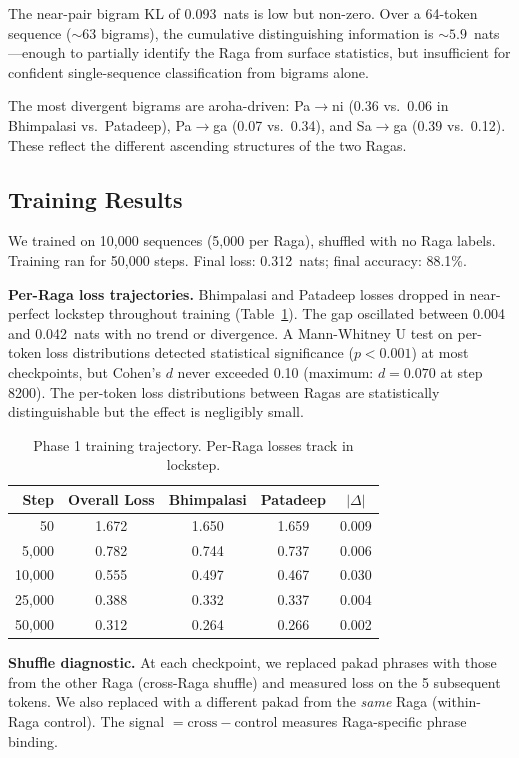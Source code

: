 \documentclass[11pt,a4paper]{article}
\begin{document}
The near-pair bigram KL of 0.093~nats is low but non-zero. Over a 64-token sequence (${\sim}63$ bigrams), the cumulative distinguishing information is ${\sim}5.9$~nats---enough to partially identify the Raga from surface statistics, but insufficient for confident single-sequence classification from bigrams alone.

The most divergent bigrams are aroha-driven: Pa$\to$ni (0.36 vs.\ 0.06 in Bhimpalasi vs.\ Patadeep), Pa$\to$ga (0.07 vs.\ 0.34), and Sa$\to$ga (0.39 vs.\ 0.12). These reflect the different ascending structures of the two Ragas.

\subsection{Training Results}

We trained on 10,000 sequences (5,000 per Raga), shuffled with no Raga labels. Training ran for 50,000 steps. Final loss: 0.312~nats; final accuracy: 88.1\%.

\textbf{Per-Raga loss trajectories.} Bhimpalasi and Patadeep losses dropped in near-perfect lockstep throughout training (Table~\ref{tab:phase1_loss}). The gap oscillated between 0.004 and 0.042~nats with no trend or divergence. A Mann-Whitney U test on per-token loss distributions detected statistical significance ($p < 0.001$) at most checkpoints, but Cohen's $d$ never exceeded 0.10 (maximum: $d = 0.070$ at step 8200). The per-token loss distributions between Ragas are statistically distinguishable but the effect is negligibly small.

\begin{table}[H]
\centering
\caption{Phase 1 training trajectory. Per-Raga losses track in lockstep.}
\label{tab:phase1_loss}
\begin{tabular}{rcccc}
\toprule
Step & Overall Loss & Bhimpalasi & Patadeep & $|\Delta|$ \\
\midrule
50 & 1.672 & 1.650 & 1.659 & 0.009 \\
5,000 & 0.782 & 0.744 & 0.737 & 0.006 \\
10,000 & 0.555 & 0.497 & 0.467 & 0.030 \\
25,000 & 0.388 & 0.332 & 0.337 & 0.004 \\
50,000 & 0.312 & 0.264 & 0.266 & 0.002 \\
\bottomrule
\end{tabular}
\end{table}

\textbf{Shuffle diagnostic.} At each checkpoint, we replaced pakad phrases with those from the other Raga (cross-Raga shuffle) and measured loss on the 5 subsequent tokens. We also replaced with a different pakad from the \emph{same} Raga (within-Raga control). The signal $= \text{cross} - \text{control}$ measures Raga-specific phrase binding.
\end{document}
